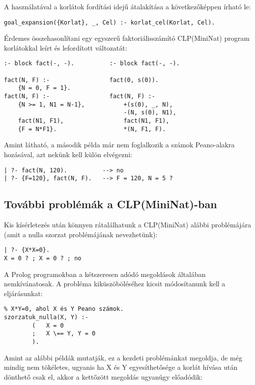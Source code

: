 A  használatával a korlátok fordítási idejű átalakítása
a következőképpen írható le:

\begin{verbatim}
goal_expansion({Korlat}, _, Cel) :- korlat_cel(Korlat, Cel).
\end{verbatim}

Érdemes összehasonlítani egy egyszerű faktoriálisszámító CLP(MiniNat)
program korlátokkal leírt és lefordított változatát:

\begin{verbatim}
:- block fact(-, -).          :- block fact(-, -).

fact(N, F) :-                 fact(0, s(0)).
    {N = 0, F = 1}.
fact(N, F) :-                 fact(N, F) :-
    {N >= 1, N1 = N-1},           +(s(0), _, N),
                                  -(N, s(0), N1),
    fact(N1, F1),                 fact(N1, F1),
    {F = N*F1}.                   *(N, F1, F).
\end{verbatim}

Amint látható, a második példa már nem foglalkozik a számok Peano-alakra
hozásával, azt nekünk kell külön elvégezni:

\begin{verbatim}
| ?- fact(N, 120).          --> no 
| ?- {F=120}, fact(N, F).   --> F = 120, N = 5 ?
\end{verbatim}

\subsection{További problémák a CLP(MiniNat)-ban}

Kis kísérletezés után könnyen rátalálhatunk a CLP(MiniNat) alábbi problémájára
(amit a nulla szorzat problémájának nevezhetünk):

\begin{verbatim}
| ?- {X*X=0}.
X = 0 ? ; X = 0 ? ; no
\end{verbatim}

A Prolog programokban a kétszeresen adódó megoldások általában nemkívánatosak.
A probléma kiküszöböléséhez kicsit módosítanunk kell a 
eljárásunkat:

\begin{verbatim}
% X*Y=0, ahol X és Y Peano számok.
szorzatuk_nulla(X, Y) :-
        (   X = 0 
        ;   X \== Y, Y = 0 
        ).
\end{verbatim}

Amint az alábbi példák mutatják, ez a kezdeti problémánkat megoldja, de
még mindig nem tökéletes, ugyanis ha X és Y egyesíthetősége a korlát hívása
után dönthető csak el, akkor a kettőzött megoldás ugyanúgy előadódik:

